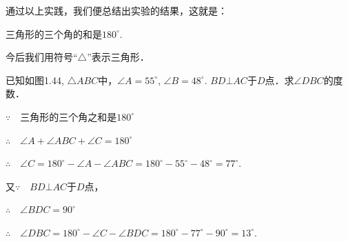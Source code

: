 通过以上实践，我们便总结出实验的结果，这就是：

\begin{blk}{}
三角形的三个角的和是$180^{\circ}$.	
\end{blk}

今后我们用符号“$\triangle$”表示三角形．

\begin{example}
	已知如图1.44, $\triangle ABC$中，$\angle A=55^{\circ}$, $\angle B=48^{\circ}$. 
$BD\bot AC$于$D$点．求$\angle DBC$的度数．
\end{example}

\begin{figure}[htp]
	\centering
{}
	\caption{}
\end{figure}

\begin{solution}
$\because\quad $三角形的三个角之和是$180^{\circ}$

$\therefore\quad \angle A+\angle ABC+\angle C=180^{\circ}$

$\therefore\quad \angle C=180^{\circ}-\angle A-\angle ABC
=180^{\circ}-55^{\circ}-48^{\circ}=77^{\circ}$.

又$\because\quad BD\bot AC$于$D$点，

$\therefore\quad \angle BDC=90^{\circ}$

$\therefore\quad \angle DBC=180^{\circ}-\angle C-\angle BDC
=180^{\circ}-77^{\circ}-90^{\circ}=13^{\circ}$.
\end{solution}

